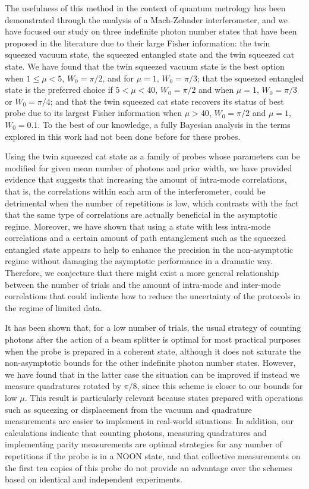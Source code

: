 The usefulness of this method in the context of quantum metrology has been demonstrated through the analysis of a Mach-Zehnder interferometer, and we have focused our study on three indefinite photon number states that have been proposed in the literature due to their large Fisher information: the twin squeezed vacuum state, the squeezed entangled state and the twin squeezed cat state. We have found that the twin squeezed vacuum state is the best option when $1\leqslant\mu <5$, $W_0=\pi/2$, and for $\mu = 1$, $W_0=\pi/3$; that the squeezed entangled state is the preferred choice if $5<\mu <40$, $W_0=\pi/2$
and when $\mu = 1$, $W_0=\pi/3$ or $W_0=\pi/4$; and that the twin squeezed cat state recovers its status of best probe due to its largest Fisher information when $\mu > 40$, $W_0=\pi/2$ and $\mu=1$, $W_0 = 0.1$. To the best of our knowledge, a fully Bayesian analysis in the terms explored in this work had not been done before for these probes. 

Using the twin squeezed cat state as a family of probes whose parameters can be modified for given mean number of photons and prior width, we have provided evidence that suggests that increasing the amount of intra-mode correlations, that is, the correlations within each arm of the interferometer, could be detrimental when the number of repetitions is low, which contrasts with the fact that the same type of correlations are actually beneficial in the asymptotic regime. Moreover, we have shown that using a state with less intra-mode correlations and a certain amount of path entanglement such as the squeezed entangled state appears to help to enhance the precision in the non-asymptotic regime without damaging the asymptotic performance in a dramatic way. Therefore, we conjecture that there might exist a more general relationship between the number of trials and the amount of  intra-mode and inter-mode correlations that could indicate how to reduce the uncertainty of the protocols in the regime of limited data.

It has been shown that, for a low number of trials, the usual strategy of counting photons after the action of a beam splitter is optimal for most practical purposes when the probe is prepared in a coherent state, although it does not saturate the non-asymptotic bounds for the other indefinite photon number states. However, we have found that in the latter case the situation can be improved if instead we measure quadratures rotated by $\pi/8$, since this scheme is closer to our bounds for low $\mu$. This result is particularly relevant because states prepared with operations such as squeezing or displacement from the vacuum and quadrature measurements are easier to implement in real-world situations. In addition, our calculations indicate that counting photons, measuring quadratures and implementing parity measurements are optimal strategies for any number of repetitions if the probe is in a NOON state, and that collective measurements on the first ten copies of this probe do not provide an advantage over the schemes based on identical and independent experiments.

